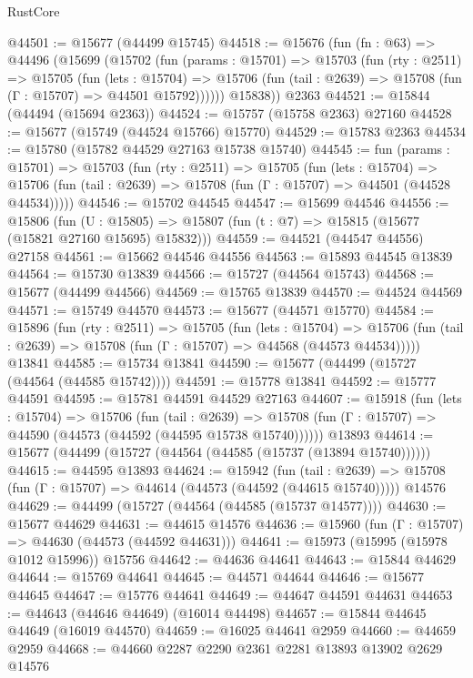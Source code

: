 \begin{lexlean}{RustCore}
\begin{coremodule}
@44501 := @15677 (@44499 @15745)
@44518 := @15676
    (fun (fn : @63) =>
    @44496
      (@15699
        (@15702
          (fun (params : @15701) =>
          @15703
            (fun (rty : @2511) =>
            @15705
              (fun (lets : @15704) =>
              @15706 (fun (tail : @2639) => @15708 (fun (Γ : @15707) => @44501 @15792))))))
        @15838))
    @2363
@44521 := @15844 (@44494 (@15694 @2363))
@44524 := @15757 (@15758 @2363) @27160
@44528 := @15677 (@15749 (@44524 @15766) @15770)
@44529 := @15783 @2363
@44534 := @15780 (@15782 @44529 @27163 @15738 @15740)
@44545 := fun (params : @15701) =>
  @15703
    (fun (rty : @2511) =>
    @15705
      (fun (lets : @15704) =>
      @15706 (fun (tail : @2639) => @15708 (fun (Γ : @15707) => @44501 (@44528 @44534)))))
@44546 := @15702 @44545
@44547 := @15699 @44546
@44556 := @15806
    (fun (U : @15805) => @15807 (fun (t : @7) => @15815 (@15677 (@15821 @27160 @15695) @15832)))
@44559 := @44521 (@44547 @44556) @27158
@44561 := @15662 @44546 @44556
@44563 := @15893 @44545 @13839
@44564 := @15730 @13839
@44566 := @15727 (@44564 @15743)
@44568 := @15677 (@44499 @44566)
@44569 := @15765 @13839
@44570 := @44524 @44569
@44571 := @15749 @44570
@44573 := @15677 (@44571 @15770)
@44584 := @15896
    (fun (rty : @2511) =>
    @15705
      (fun (lets : @15704) =>
      @15706 (fun (tail : @2639) => @15708 (fun (Γ : @15707) => @44568 (@44573 @44534)))))
    @13841
@44585 := @15734 @13841
@44590 := @15677 (@44499 (@15727 (@44564 (@44585 @15742))))
@44591 := @15778 @13841
@44592 := @15777 @44591
@44595 := @15781 @44591 @44529 @27163
@44607 := @15918
    (fun (lets : @15704) =>
    @15706
      (fun (tail : @2639) =>
      @15708 (fun (Γ : @15707) => @44590 (@44573 (@44592 (@44595 @15738 @15740))))))
    @13893
@44614 := @15677 (@44499 (@15727 (@44564 (@44585 (@15737 (@13894 @15740))))))
@44615 := @44595 @13893
@44624 := @15942
    (fun (tail : @2639) => @15708 (fun (Γ : @15707) => @44614 (@44573 (@44592 (@44615 @15740)))))
    @14576
@44629 := @44499 (@15727 (@44564 (@44585 (@15737 @14577))))
@44630 := @15677 @44629
@44631 := @44615 @14576
@44636 := @15960 (fun (Γ : @15707) => @44630 (@44573 (@44592 @44631)))
@44641 := @15973 (@15995 (@15978 @1012 @15996)) @15756
@44642 := @44636 @44641
@44643 := @15844 @44629
@44644 := @15769 @44641
@44645 := @44571 @44644
@44646 := @15677 @44645
@44647 := @15776 @44641
@44649 := @44647 @44591 @44631
@44653 := @44643 (@44646 @44649) (@16014 @44498)
@44657 := @15844 @44645 @44649 (@16019 @44570)
@44659 := @16025 @44641 @2959
@44660 := @44659 @2959
@44668 := @44660 @2287 @2290 @2361 @2281 @13893 @13902 @2629 @14576

\end{coremodule}
\end{lexlean}
